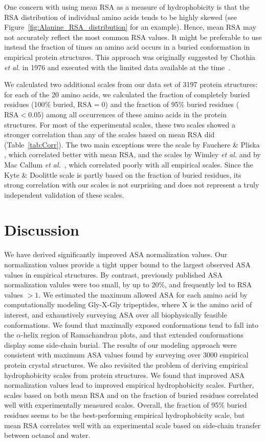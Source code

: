 \documentclass[11pt]{article}
\begin{document}
One concern with using mean RSA as a measure of hydrophobicity is that the RSA distribution of individual amino acids tends to be highly skewed (see Figure~\ref{fig:Alanine_RSA_distribution} for an example). Hence, mean RSA may not accurately reflect the most common RSA values. It might be preferable to use instead the fraction of times an amino acid occurs in a buried conformation in empirical protein structures. This approach was originally suggested by Chothia \emph{et al.} in 1976 and executed with the limited data available at the time~\cite{Chothia1976}.

We calculated two additional scales from our data set of 3197 protein structures: for each of the 20 amino acids, we calculated the fraction of completely buried residues (100\% buried, $\text{RSA}=0$) and the fraction of 95\% buried residues ($\text{RSA}<0.05$) among all occurrences of these amino acids in the protein structures. For most of the experimental scales, these two scales showed a stronger correlation than any of the scales based on mean RSA did (Table~\ref{tab:Corr}). The two main exceptions were the scale by Fauchere \& Pliska \cite{Fauchere1983}, which correlated better with mean RSA, and the scales by Wimley \emph{et al.} \cite{Wimley1996} and by Mac Callum \emph{et al.}~\cite{MacCallum2007}, which correlated poorly with all empirical scales. Since the Kyte \& Doolittle scale \cite{Kyte1981} is partly based on the fraction of buried residues, its strong correlation with our scales is not surprising and does not represent a truly independent validation of these scales.


\section*{Discussion}

We have derived significantly improved ASA normalization values. Our normalization values provide a tight upper bound to the largest observed ASA values in empirical structures. By contrast, previously published ASA normalization valules were too small, by up to 20\%, and frequently led to RSA values $>1$. We estimated the maximum allowed ASA for each amino acid by computationally modeling Gly-X-Gly tripeptides, where X is the amino acid of interest, and exhaustively surveying ASA over all biophysically feasible conformations. We found that maximally exposed conformations tend to fall into the $\alpha$-helix region of Ramachandran plots, and that extended conformations display some side-chain burial. The results of our modeling approach were consistent with maximum ASA values found by surveying over 3000 empirical protein crystal structures. We also revisited the problem of deriving empirical hydrophobicity scales from protein structures. We found that improved ASA normalization values lead to improved empirical hydrophobicity scales. Further, scales based on both mean RSA and on the fraction of buried residues correlated well with experimentally measured scales. Overall, the fraction of 95\% buried residues seems to be the best-performing empirical hydrophobicity scale, but mean RSA correlates well with an experimental scale based on side-chain transfer between octanol and water.
\end{document}
